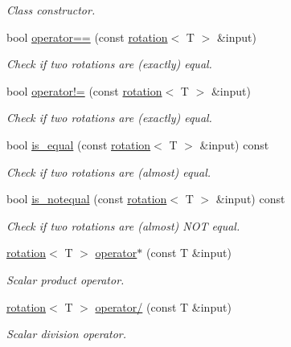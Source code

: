 \begin{DoxyCompactItemize}
\begin{DoxyCompactList}\small\item\em Class constructor. \end{DoxyCompactList}\item 
bool \hyperlink{classddd_1_1rotation_ae704ea435ead1c66b7ca0bd4899ce2bc}{operator==} (const \hyperlink{classddd_1_1rotation}{rotation}$<$ T $>$ \&input)
\begin{DoxyCompactList}\small\item\em Check if two rotations are (exactly) equal. \end{DoxyCompactList}\item 
bool \hyperlink{classddd_1_1rotation_abfeae27a919ada418d2cdcce96e5e08d}{operator!=} (const \hyperlink{classddd_1_1rotation}{rotation}$<$ T $>$ \&input)
\begin{DoxyCompactList}\small\item\em Check if two rotations are (exactly) equal. \end{DoxyCompactList}\item 
bool \hyperlink{classddd_1_1rotation_a3af65c771a81cd62655802ce3ee22614}{is\+\_\+equal} (const \hyperlink{classddd_1_1rotation}{rotation}$<$ T $>$ \&input) const
\begin{DoxyCompactList}\small\item\em Check if two rotations are (almost) equal. \end{DoxyCompactList}\item 
bool \hyperlink{classddd_1_1rotation_aa1aba1ad41c7d09edce377bd5cb6efbb}{is\+\_\+notequal} (const \hyperlink{classddd_1_1rotation}{rotation}$<$ T $>$ \&input) const
\begin{DoxyCompactList}\small\item\em Check if two rotations are (almost) N\+OT equal. \end{DoxyCompactList}\item 
\hyperlink{classddd_1_1rotation}{rotation}$<$ T $>$ \hyperlink{classddd_1_1rotation_aada9691ca7067feefd0a0206f8c8d035}{operator$\ast$} (const T \&input)
\begin{DoxyCompactList}\small\item\em Scalar product operator. \end{DoxyCompactList}\item 
\hyperlink{classddd_1_1rotation}{rotation}$<$ T $>$ \hyperlink{classddd_1_1rotation_ac95799a9a25f9653d39ab3339b8085b7}{operator/} (const T \&input)
\begin{DoxyCompactList}\small\item\em Scalar division operator. \end{DoxyCompactList}\item 

\end{DoxyCompactItemize}
